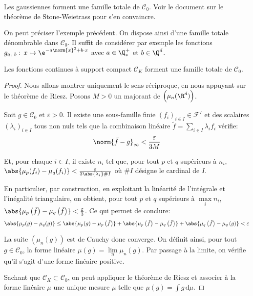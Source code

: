 \begin{listexemples}
\item
Les gaussiennes forment une famille totale de $\mathcal{C}_0$. Voir le document sur le théorème de Stone-Weietrass pour s'en convaincre.
\item
On peut préciser l'exemple précédent. 
On dispose ainsi d'une famille totale dénombrable dans $\mathcal{C}_0$. Il suffit de considérer par exemple les fonctions $g_{a;~b}: \, x \mapsto \e^{-a\norm{x}^2+ b \cdot x}$ avec $a \in \Q^+_*$ et $b \in \Q^d$.
\item
Les fonctions continues à support compact $\mathcal{C}_K$ forment une famille totale de $\mathcal{C}_0$.
\end{listexemples}



\begin{proof}
Nous allons montrer uniquement le sens réciproque, en nous appuyant sur le théorème de Riesz. Posons $M > 0$ un majorant de $\left (\mu_n(\R^d)\right )$.

\medskip
Soit $g \in \mathcal{C}_0$ et $\varepsilon>0$. Il existe une sous-famille finie $(f_i)_{i \in I} \in \mathcal{F}^I$ et des scalaires $(\lambda_i)_{i \in I}$ tous non nuls tels que la combinaison linéaire $\tilde{f} = \displaystyle{\sum \limits_{i \in I}} \lambda_i f_i$ vérifie:
\[
\norm{\tilde{f} - g}_{\infty} <  \frac{\varepsilon}{3M}
\]

Et, pour chaque $i \in I$, il existe $n_i$ tel que, pour tout $p$ et $q$ supérieurs à $n_i$, $\abs{\mu_p(f_i) - \mu_q(f_i)} < \frac{\varepsilon}{3 \abs{\lambda_i} \# I}$ où $\# I$ désigne le cardinal de $I$.

En particulier, par construction, en exploitant la linéarité de l'intégrale et l'inégalité triangulaire, on obtient, pour tout $p$ et $q$ supérieurs à $\max \limits_i n_i$, $\abs{\mu_p \left (\tilde{f}\right ) - \mu_q \left (\tilde{f}\right )} < \frac{\varepsilon}{3}$. Ce qui permet de conclure:
\[
\abs{\mu_p(g) - \mu_q(g) } \leq \abs{\mu_p(g) - \mu_p\left ( \tilde{f} \right )} + \abs{\mu_p \left (\tilde{f}\right ) -  \mu_q\left ( \tilde{f} \right )} + \abs{\mu_q \left (\tilde{f}\right ) - \mu_q \left ( g\right ) } < \varepsilon
\]

La suite $\left (\mu_n(g)\right )$ est de Cauchy donc converge. On définit ainsi, pour tout $g \in \mathcal{C}_0$, la forme linéaire $\mu(g) = \lim \limits_{n} \mu_n(g)$. Par passage à la limite, on vérifie qu'il s'agit d'une forme linéaire positive.

Sachant que $\mathcal{C}_K \subset \mathcal{C}_0$, on peut appliquer le théorème de Riesz et associer à la forme linéaire $\mu$ une unique mesure $\mu$ telle que $\mu(g) = \displaystyle{\int} g \, \mathrm d \mu$.
\end{proof}


